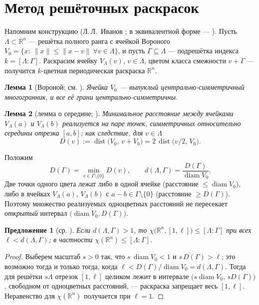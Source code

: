 \documentclass[12pt]{article}
\newtheorem{lemma}{Лемма}
\newtheorem{proposition}{Предложение}
\theoremstyle{definition}
\theoremstyle{remark}
\newcommand{\R}{\mathbb{R}}
\newcommand{\diam}{\operatorname{diam}}
\newcommand{\dist}{\operatorname{dist}}
\begin{document}
\section{Метод решёточных раскрасок}\label{sec:method}

Напомним конструкцию (Л.\,Л.~Иванов \cite{Ivanov2011}; в эквивалентной форме
--- \cite[предложение~5]{ABPR}). Пусть $\Lambda\subset\R^n$ --- решётка полного
ранга с ячейкой Вороного
$V_0=\{x:\ \|x\|\le\|x-v\|\ \forall v\in\Lambda\}$, и пусть
$\Gamma\subseteq\Lambda$ --- подрешётка индекса $k=[\Lambda:\Gamma]$. Раскрасим
ячейку $V_\Lambda(v)$, $v\in\Lambda$, цветом класса смежности $v+\Gamma$ ---
получится $k$-цветная периодическая раскраска $\R^n$.

\begin{lemma}[Вороной; см. \cite{Voronoi}]\label{lem:sym}
Ячейка $V_0$ --- выпуклый центрально-симметричный многогранник, и все её грани
центрально-симметричны.
\end{lemma}

\begin{lemma}[лемма о середине; {\cite[лемма~2]{Ivanov2011}}]\label{lem:mid}
Минимальное расстояние между ячейками $V_\Lambda(a)$ и $V_\Lambda(b)$
реализуется на паре точек, симметричных относительно середины отрезка $[a,b]$;
как следствие, для $v\in\Lambda$
\[
D(v):=\dist\bigl(V_0,\,v+V_0\bigr)=2\,\dist\bigl(v/2,\,V_0\bigr).
\]
\end{lemma}

Положим
\[
D(\Gamma)=\min_{v\in\Gamma\setminus\{0\}}D(v),\qquad
d(\Lambda,\Gamma)=\frac{D(\Gamma)}{\diam V_0}.
\]
Две точки одного цвета лежат либо в одной ячейке (расстояние $\le\diam V_0$),
либо в ячейках $V_\Lambda(a)$, $V_\Lambda(b)$ с $a-b\in\Gamma\setminus\{0\}$
(расстояние $\ge D(\Gamma)$). Поэтому множество реализуемых одноцветных
расстояний не пересекает \emph{открытый} интервал $\bigl(\diam V_0,
D(\Gamma)\bigr)$.

\begin{proposition}[{ср. \cite[Prop.~5]{ABPR}}]\label{prop:crit}
Если $d(\Lambda,\Gamma)>1$, то $\chi\bigl(\R^n,[1,\ell]\bigr)\le[\Lambda:\Gamma]$
при всех $\ell<d(\Lambda,\Gamma)$; в частности $\chi(\R^n)\le[\Lambda:\Gamma]$.
\end{proposition}

\begin{proof}
Выберем масштаб $s>0$ так, что $s\,\diam V_0<1$ и $s\,D(\Gamma)>\ell$; это
возможно тогда и только тогда, когда $\ell<D(\Gamma)/\diam V_0=d(\Lambda,\Gamma)$.
Тогда для решётки $s\Lambda$ отрезок $[1,\ell]$ целиком лежит в интервале
$\bigl(s\diam V_0,\,sD(\Gamma)\bigr)$, свободном от одноцветных расстояний,
--- раскраска запрещает весь $[1,\ell]$. Неравенство для $\chi(\R^n)$
получается при $\ell=1$.
\end{proof}
\end{document}
